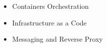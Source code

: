 \divider

\begin{itemize}
    \item Containers Orchestration
\end{itemize}


\divider

\begin{itemize}
    \item Infrastructure as a Code
\end{itemize}


\divider

\begin{itemize}
    \item Messaging and Reverse Proxy 
\end{itemize}


\divider


\bigskip
\bigskip
\bigskip
\bigskip
\bigskip
\bigskip


\clearpage
